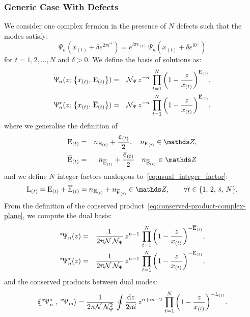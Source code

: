 \subsubsection{Generic Case With Defects}
\label{sec:generic-twisted}

We consider one complex fermion in the presence of $N$ defects such that the modes satisfy:
\begin{equation}
  \Psi_n( x_{(t)} + \delta e^{2 \pi i^+} )
  =
  e^{i \pi \epsilon_{(t)}}\, \Psi_n( x_{(t)} + \delta e^{i 0^+} )
\end{equation}
for $t = 1, 2, \dots, N$ and $\delta > 0$.
We define the basis of solutions as:
\begin{eqnarray}
  \Psi_n( z;\, \qty{x_{(t)},\, \rE_{(t)}} )
  & = &
  \cN_{\Psi}\,
  z^{-n}\,
  \finiteprod{t}{1}{N} \qty( 1 - \frac{z}{x_{(t)}} )^{\rE_{(t)}},
  \label{eq:generic-case-basis}
  \\
  \Psi^*_n( z;\, \qty{x_{(t)},\, \brE_{(t)}} )
  & = &
  \cN_{\Psi}\,
  z^{-n}\,
  \finiteprod{t}{1}{N} \qty( 1 - \frac{z}{x_{(t)}} )^{\brE_{(t)}},
  \label{eq:generic-case-basis-conjugate}
\end{eqnarray}
where we generalise the definition of
\begin{eqnarray}
  \rE_{(t)}
  & = &
  n_{\rE_{(t)}} + \frac{\epsilon_{(t)}}{2},
  \quad
  n_{\rE_{(t)}} \in \Z,
  \\
  \brE_{(t)}
  & = &
  n_{\brE_{(t)}} + \frac{\bepsilon_{(t)}}{2}
  \quad
  n_{\brE_{(t)}} \in \Z
\end{eqnarray}
and we define $N$ integer factors analogous to~\eqref{eq:usual_integer_factor}:
\begin{equation}
  \rL_{(t)}
  =
  \rE_{(t)} + \brE_{(t)}
  =
  n_{\rE_{(t)}} + n_{\brE_{(t)}}  \in \Z,
  \qquad
  \forall t \in \qty{ 1,\, 2,\, \dots,\, N }.
\end{equation}
From the definition of the conserved product~\eqref{eq:conserved-product-complex-plane}, we compute the dual basis:
\begin{eqnarray}
  \dual{\Psi}_n( z )
  & = &
  \frac{1}{2 \pi \cN\, \cN_{\Psi}}\,
  z^{n-1}\,
  \finiteprod{t}{1}{N} \qty( 1 - \frac{z}{x_{(t)}} )^{-\brE_{(t)}},
  \\
  \dual{\Psi}^*_n( z )
  & = &
  \frac{1}{2 \pi \cN\, \cN_{\Psi}}\,
  z^{n-1}\,
  \finiteprod{t}{1}{N} \qty( 1 - \frac{z}{x_{(t)}} )^{-\rE_{(t)}},
\end{eqnarray}
and the conserved products between dual modes:
\begin{equation}
  \lconsprod{\dual{\Psi}_n^*}{\dual{\Psi}_m}
  =
  \frac{1}{2 \pi \cN\, \cN_{\Psi}^2}\,
  \oint \ddz\,
  z^{n+m-2}\,
  \finiteprod{t}{1}{N} \qty( 1 - \frac{z}{x_{(t)}} )^{-\rL_{(t)}}.
\end{equation}
